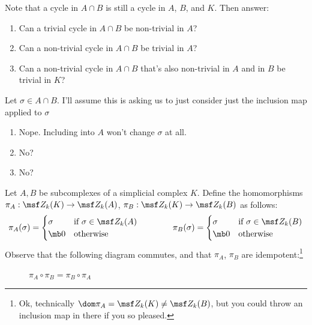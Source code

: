 \begin{problem}[16.32]
  Note that a cycle in $A \cap B$ is still a cycle in $A$, $B$, and
  $K$. Then answer:
  \begin{enumerate}
  \item Can a trivial cycle in $A \cap B$ be non-trivial in $A$?
  \item Can a non-trivial cycle in $A \cap B$ be trivial in $A$?
  \item Can a non-trivial cycle in $A \cap B$ that's also
    non-trivial in $A$ and in $B$ be trivial in $K$?
  \end{enumerate}
\end{problem}
\begin{solution}
  Let $\sigma \in A \cap B$. I'll assume this is asking us to just
  consider just the inclusion map applied to $\sigma$
  \begin{enumerate}
  \item Nope. Including into $A$ won't change $\sigma$ at all.
  \item No?
  \item No?
  \end{enumerate}
\end{solution}

\begin{definition}
  Let $A,B$ be subcomplexes of a simplicial complex $K$. Define the
  homomorphisms $\pi_A : \msf Z_k(K) \to \msf Z_k(A)$, $\pi_B : \msf
  Z_k(K) \to \msf Z_k(B)$ as follows:
  \[
    \pi_A(\sigma) =
    \begin{cases}
      \sigma & \text{if } \sigma \in \msf Z_k(A) \\
      \mb 0 & \text{otherwise}
    \end{cases}
    \qquad\qquad
    \pi_B(\sigma) =
    \begin{cases}
      \sigma & \text{if } \sigma \in \msf Z_k(B) \\
      \mb 0 & \text{otherwise}
    \end{cases}
  \]
  Observe that the following diagram commutes, and that $\pi_A$,
  $\pi_B$ are idempotent:\footnote{Ok, technically $\dom \pi_A = \msf
    Z_k(K) \neq \msf Z_k(B)$, but you could throw an inclusion map in
    there if you so pleased.}
  \begin{figure}[H]
    \centering
    \caption{$\pi_A \circ \pi_B = \pi_B \circ \pi_A$}
  \end{figure}
\end{definition}

